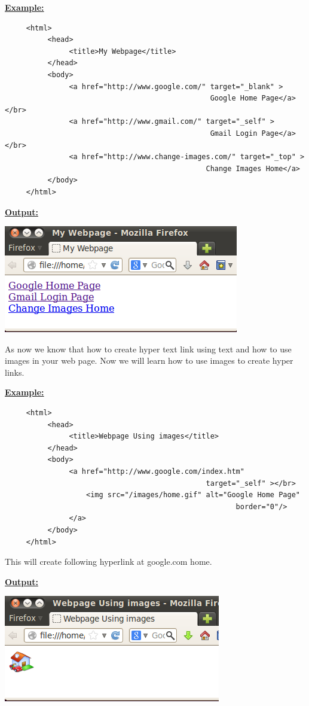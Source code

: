 \documentclass[11pt,a4paper]{article}
\begin{document}
\underline{\textbf{Example:}}
\begin{verbatim}
     <html>
          <head>
               <title>My Webpage</title>
          </head>
          <body>
               <a href="http://www.google.com/" target="_blank" >
                                                Google Home Page</a></br>
               <a href="http://www.gmail.com/" target="_self" >
                                                Gmail Login Page</a></br>
               <a href="http://www.change-images.com/" target="_top" >       
                                               Change Images Home</a>
          </body>
     </html>
\end{verbatim}
\underline{\textbf{Output:}}\

\includegraphics[scale=0.9]{TextLinks.png}

As now we know that how to create hyper text link using text and how to use images in your web page. Now we will learn how to use images to create hyper links. \

\underline{\textbf{Example:}}
\begin{verbatim}
     <html>
          <head>
               <title>Webpage Using images</title>
          </head>
          <body>
               <a href="http://www.google.com/index.htm"  
                                               target="_self" ></br>
                   <img src="/images/home.gif" alt="Google Home Page"     
                                                      border="0"/>
               </a>
          </body>
     </html>
\end{verbatim}

This will create following hyperlink at google.com home.\


\underline{\textbf{Output:}}\

\includegraphics[scale=0.9]{ImageLink.png}
\end{document}

